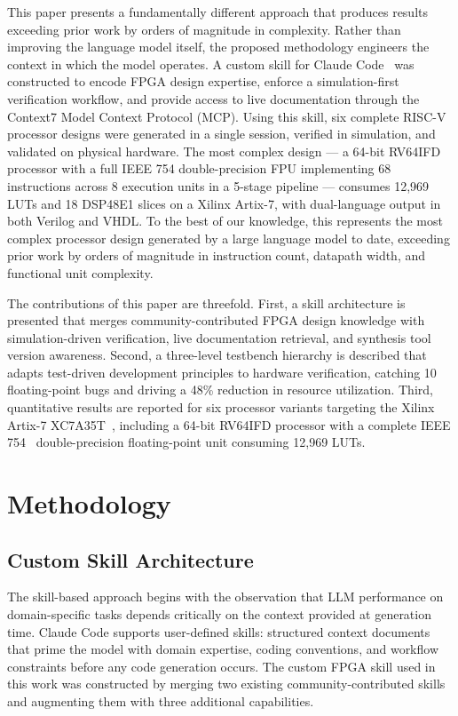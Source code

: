 \documentclass[journal]{IEEEtran}
\begin{document}
This paper presents a fundamentally different approach that produces results exceeding prior work by orders of magnitude in complexity. Rather than improving the language model itself, the proposed methodology engineers the context in which the model operates. A custom skill for Claude Code~\cite{anthropic2026claude} was constructed to encode FPGA design expertise, enforce a simulation-first verification workflow, and provide access to live documentation through the Context7 Model Context Protocol (MCP). Using this skill, six complete RISC-V~\cite{waterman2019riscv} processor designs were generated in a single session, verified in simulation, and validated on physical hardware. The most complex design --- a 64-bit RV64IFD processor with a full IEEE 754 double-precision FPU implementing 68 instructions across 8 execution units in a 5-stage pipeline --- consumes 12,969 LUTs and 18 DSP48E1 slices on a Xilinx Artix-7, with dual-language output in both Verilog and VHDL. To the best of our knowledge, this represents the most complex processor design generated by a large language model to date, exceeding prior work by orders of magnitude in instruction count, datapath width, and functional unit complexity.

The contributions of this paper are threefold. First, a skill architecture is presented that merges community-contributed FPGA design knowledge with simulation-driven verification, live documentation retrieval, and synthesis tool version awareness. Second, a three-level testbench hierarchy is described that adapts test-driven development principles to hardware verification, catching 10 floating-point bugs and driving a 48\% reduction in resource utilization. Third, quantitative results are reported for six processor variants targeting the Xilinx Artix-7 XC7A35T~\cite{xilinx2020ds180}, including a 64-bit RV64IFD processor with a complete IEEE 754~\cite{ieee754_2019} double-precision floating-point unit consuming 12,969 LUTs.

\section{Methodology}

\subsection{Custom Skill Architecture}

The skill-based approach begins with the observation that LLM performance on domain-specific tasks depends critically on the context provided at generation time. Claude Code supports user-defined skills: structured context documents that prime the model with domain expertise, coding conventions, and workflow constraints before any code generation occurs. The custom FPGA skill used in this work was constructed by merging two existing community-contributed skills and augmenting them with three additional capabilities.
\end{document}

